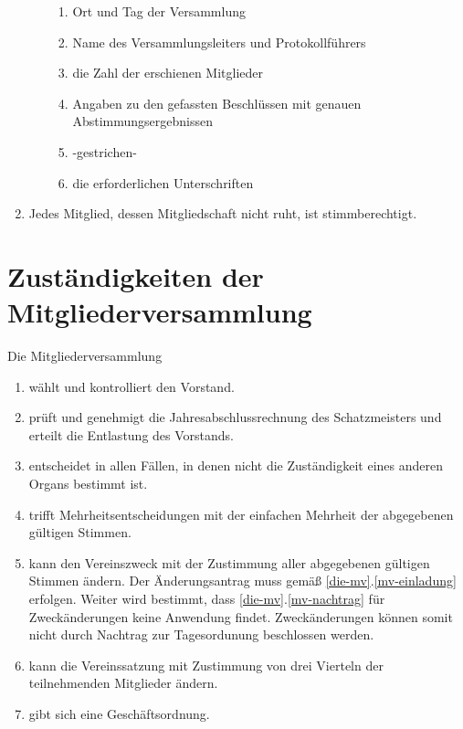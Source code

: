 \documentclass[a4paper, 12pt]{scrartcl}
\begin{document}
\begin{enumerate}
\begin{enumerate}
\begin{enumerate}
	  		\item Ort und Tag der Versammlung
	    	\item Name des Versammlungsleiters und Protokollführers
	    	\item die Zahl der erschienen Mitglieder
	    	\item Angaben zu den gefassten Beschlüssen mit genauen Abstimmungsergebnissen
	    	\item -gestrichen-
	    	\item die erforderlichen Unterschriften
			\end{enumerate}
		\end{enumerate}
	\item Jedes Mitglied, dessen Mitgliedschaft nicht ruht, ist stimmberechtigt.
\end{enumerate}

\section{Zuständigkeiten der Mitgliederversammlung}
Die Mitgliederversammlung
\begin{enumerate}
	\item wählt und kontrolliert den Vorstand.
	\item prüft und genehmigt die Jahresabschlussrechnung des Schatzmeisters und erteilt die Entlastung des Vorstands.
	\item entscheidet in allen Fällen, in denen nicht die Zuständigkeit eines anderen Organs bestimmt ist.
	\item trifft Mehrheitsentscheidungen mit der einfachen Mehrheit der abgegebenen gültigen Stimmen.
	\item kann den Vereinszweck mit der Zustimmung aller abgegebenen gültigen Stimmen ändern. Der Änderungsantrag muss gemäß \ref{die-mv}.\ref{mv-einladung} erfolgen. Weiter wird bestimmt, dass \ref{die-mv}.\ref{mv-nachtrag} für Zweckänderungen keine Anwendung findet. Zweckänderungen können somit nicht durch Nachtrag zur Tagesordunung beschlossen werden.
	\item kann die Vereinssatzung mit Zustimmung von drei Vierteln der teilnehmenden Mitglieder ändern. 
	\item gibt sich eine Geschäftsordnung.
\end{enumerate}
\end{document}
